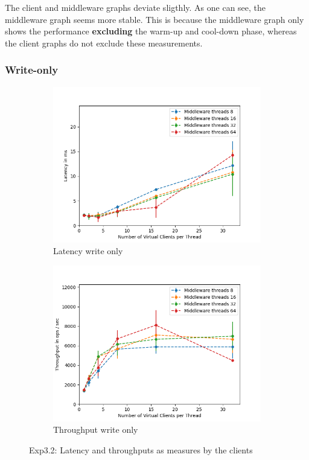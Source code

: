 \documentclass[11pt,a4paper]{article}
\begin{document}
The client and middleware graphs deviate sligthly.
As one can see, the middleware graph seems more stable.
This is because the middleware graph only shows the performance \textbf{excluding} the warm-up and cool-down phase, whereas the client graphs do not exclude these measurements.


\subsubsection{Write-only}

\begin{figure}[H]
\centering
\begin{subfigure}{.5\textwidth}
    \centering
    \includegraphics[width=\textwidth]{img/exp3_2/exp3_2__latency_client_write_1.png}
    \caption{Latency write only}
    \label{fig:mesh1}
\end{subfigure}%
\begin{subfigure}{.5\textwidth}
      \centering
    \includegraphics[width=\textwidth]{img/exp3_2/exp3_2__throughput_client_write_1.png}
    \caption{Throughput write only}
    \label{fig:mesh1}
\end{subfigure}
\caption{Exp3.2: Latency and throughputs as measures by the clients}
\label{fig:test}
\end{figure}
\end{document}
